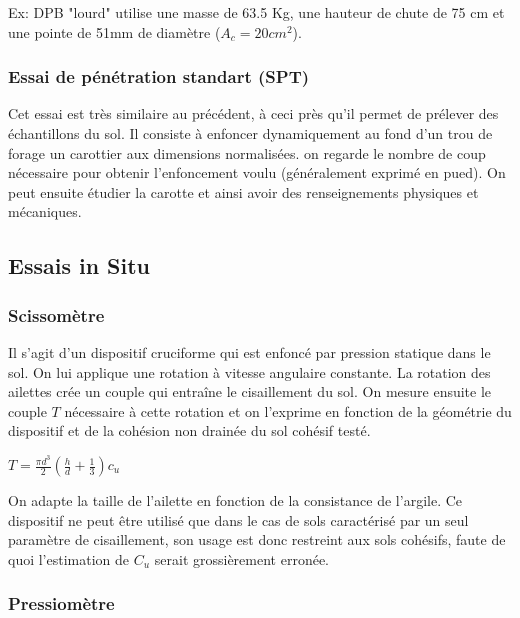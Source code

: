             Ex: DPB "lourd" utilise une masse de 63.5 Kg, une hauteur de chute de 75 cm et une pointe de 51mm de diamètre ($A_c = 20 cm^2$).
            
        \subsubsection{Essai de pénétration standart (SPT)}
        
            Cet essai est très similaire au précédent, à ceci près qu'il permet de prélever des échantillons du sol. Il consiste à enfoncer dynamiquement au fond d'un trou de forage un carottier aux dimensions normalisées. on regarde le nombre de coup nécessaire pour obtenir l'enfoncement voulu (généralement exprimé en pued). On peut ensuite étudier la carotte et ainsi avoir des renseignements physiques et mécaniques.
            
    \subsection{Essais in Situ}
        
        \subsubsection{Scissomètre}
        
            Il s'agit d'un dispositif cruciforme qui est enfoncé par pression statique dans le sol. On lui applique une rotation à vitesse angulaire constante. La rotation des ailettes crée un couple qui entraîne le cisaillement du sol. On mesure ensuite le couple $T$ nécessaire à cette rotation et on l'exprime en fonction de la géométrie du dispositif et de la cohésion non drainée du sol cohésif testé.
            
            \begin{center}
                $T=\frac{\pi d^3}{2} (\frac{h}{d}+\frac{1}{3})c_u$
            \end{center}
            
            On adapte la taille de l'ailette en fonction de la consistance de l'argile. Ce dispositif ne peut être utilisé que dans le cas de sols caractérisé par un seul paramètre de cisaillement, son usage est donc restreint aux sols cohésifs, faute de quoi l'estimation de $C_u$ serait grossièrement erronée.
            
        \subsubsection{Pressiomètre}
            
